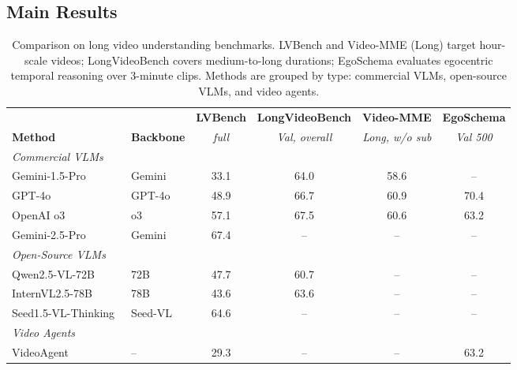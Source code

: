 \documentclass[sigconf, screen, review, anonymous]{acmart}
\begin{document}
\subsection{Main Results}
\label{sec:results}


\begin{table}[t]
  \centering
  \caption{Comparison on long video understanding benchmarks.
    LVBench and Video-MME (Long) target hour-scale videos;
    LongVideoBench covers medium-to-long durations;
    EgoSchema evaluates egocentric temporal reasoning over 3-minute clips.
    Methods are grouped by type: commercial VLMs, open-source VLMs,
    and video agents.}
  \label{tab:main_comparison}
  \small
  \begin{tabular}{ll cccc}
    \toprule
    & & \textbf{LVBench} & \textbf{LongVideoBench} & \textbf{Video-MME} & \textbf{EgoSchema} \\
    \textbf{Method} & \textbf{Backbone}
    & \textit{full}
    & \textit{Val, overall}
    & \textit{Long, w/o sub}
    & \textit{Val 500} \\
    \midrule
    \multicolumn{6}{l}{\textit{Commercial VLMs}} \\
    Gemini-1.5-Pro~\cite{gemini15}
      & Gemini        & 33.1 & 64.0 & 58.6 & --   \\
    GPT-4o~\cite{gpt4o}
      & GPT-4o        & 48.9 & 66.7 & 60.9 & 70.4 \\
    OpenAI o3~\cite{o3}
      & o3            & 57.1 & 67.5 & 60.6 & 63.2 \\
    Gemini-2.5-Pro~\cite{gemini25}
      & Gemini        & 67.4 & --   & --   & --   \\
    \midrule
    \multicolumn{6}{l}{\textit{Open-Source VLMs}} \\
    Qwen2.5-VL-72B~\cite{qwen}
      & 72B           & 47.7 & 60.7 & --   & --   \\
    InternVL2.5-78B~\cite{internvl}
      & 78B           & 43.6 & 63.6 & --   & --   \\
    Seed1.5-VL-Thinking~\cite{seed}
      & Seed-VL       & 64.6 & --   & --   & --   \\
    \midrule
    \multicolumn{6}{l}{\textit{Video Agents}} \\
    VideoAgent~\cite{videoagent}
      & --            & 29.3 & --   & --   & 63.2 \\

\end{tabular}
\end{table}
\end{document}
